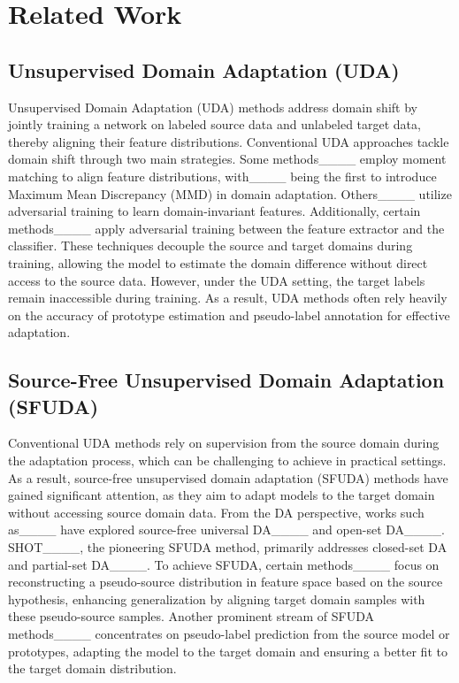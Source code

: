 \section{Related Work}
\subsection{Unsupervised Domain Adaptation (UDA)} 

Unsupervised Domain Adaptation (UDA) methods address domain shift by jointly training a network on labeled source data and unlabeled target data, thereby aligning their feature distributions. Conventional UDA approaches tackle domain shift through two main strategies. Some methods____ employ moment matching to align feature distributions, with____ being the first to introduce Maximum Mean Discrepancy (MMD) in domain adaptation. Others____ utilize adversarial training to learn domain-invariant features. Additionally, certain methods____ apply adversarial training between the feature extractor and the classifier. These techniques decouple the source and target domains during training, allowing the model to estimate the domain difference without direct access to the source data. However, under the UDA setting, the target labels remain inaccessible during training. As a result, UDA methods often rely heavily on the accuracy of prototype estimation and pseudo-label annotation for effective adaptation.

\subsection{Source-Free Unsupervised Domain Adaptation (SFUDA)}

Conventional UDA methods rely on supervision from the source domain during the adaptation process, which can be challenging to achieve in practical settings. As a result, source-free unsupervised domain adaptation (SFUDA) methods have gained significant attention, as they aim to adapt models to the target domain without accessing source domain data. From the DA perspective, works such as____ have explored source-free universal DA____ and open-set DA____. SHOT____, the pioneering SFUDA method, primarily addresses closed-set DA and partial-set DA____. To achieve SFUDA, certain methods____ focus on reconstructing a pseudo-source distribution in feature space based on the source hypothesis, enhancing generalization by aligning target domain samples with these pseudo-source samples. Another prominent stream of SFUDA methods____ concentrates on pseudo-label prediction from the source model or prototypes, adapting the model to the target domain and ensuring a better fit to the target domain distribution.


